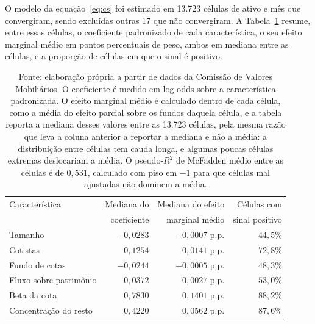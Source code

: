 \documentclass[12pt,a4paper]{article}
\begin{document}
O modelo da equação~\eqref{eq:cs} foi estimado em 13.723 células de ativo e mês que
convergiram, sendo excluídas outras 17 que não convergiram. A Tabela~\ref{tab:theta} resume,
entre essas células, o coeficiente padronizado de cada característica, o seu efeito marginal
médio em pontos percentuais de peso, ambos em mediana entre as células, e a proporção de
células em que o sinal é positivo.

\begin{table}[h]\centering\small
\caption{Coeficiente, efeito marginal médio e consistência de sinal de cada característica,
entre as 13.723 células de ativo e mês estimadas.}
\label{tab:theta}
\begin{tabular}{@{}lrrr@{}}
\toprule
Característica & Mediana do & Mediana do efeito & Células com \\
 & coeficiente & marginal médio & sinal positivo \\
\midrule
Tamanho & $-0{,}0283$ & $-0{,}0007$ p.p. & $44{,}5\%$ \\
Cotistas & $0{,}1254$ & $0{,}0141$ p.p. & $72{,}8\%$ \\
Fundo de cotas & $-0{,}0244$ & $-0{,}0005$ p.p. & $48{,}3\%$ \\
Fluxo sobre patrimônio & $0{,}0372$ & $0{,}0027$ p.p. & $53{,}0\%$ \\
Beta da cota & $0{,}7830$ & $0{,}1401$ p.p. & $88{,}2\%$ \\
Concentração do resto & $0{,}4220$ & $0{,}0562$ p.p. & $87{,}6\%$ \\
\bottomrule
\end{tabular}
\caption*{\footnotesize Fonte: elaboração própria a partir de dados da Comissão de Valores
Mobiliários. O coeficiente é medido em log-odds sobre a característica padronizada. O efeito
marginal médio é calculado dentro de cada célula, como a média do efeito parcial sobre os
fundos daquela célula, e a tabela reporta a mediana desses valores entre as 13.723 células,
pela mesma razão que leva a coluna anterior a reportar a mediana e não a média: a distribuição
entre células tem cauda longa, e algumas poucas células extremas deslocariam a média. O
pseudo-$R^2$ de McFadden médio entre as células é de $0{,}531$, calculado com piso em $-1$
para que células mal ajustadas não dominem a média.}
\end{table}
\end{document}
